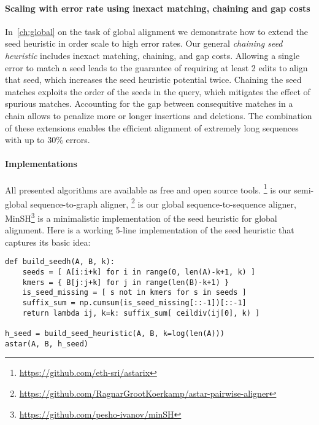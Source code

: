 \paragraph{Scaling with error rate using inexact matching, chaining and gap costs}
In~\cref{ch:global} on the task of global alignment we demonstrate how to extend
the seed heuristic in order scale to high error rates. Our general
\emph{chaining seed heuristic} includes inexact matching, chaining, and gap
costs. Allowing a single error to match a seed leads to the guarantee of
requiring at least 2 edits to align that seed, which increases the seed
heuristic potential twice. Chaining the seed matches exploits the order of the
seeds in the query, which mitigates the effect of spurious matches. Accounting
for the gap between consequitive matches in a chain allows to penalize more or
longer insertions and deletions. The combination of these extensions enables the
efficient alignment of extremely long sequences with up to 30\% errors. 

\paragraph{Implementations}
All presented algorithms are available as free and open source tools.
\astarix\footnote{\url{https://github.com/eth-sri/astarix}} is our semi-global
sequence-to-graph aligner,
\astarpa\footnote{\url{https://github.com/RagnarGrootKoerkamp/astar-pairwise-aligner}}
is our global sequence-to-sequence aligner,
MinSH\footnote{\url{https://github.com/pesho-ivanov/minSH}} is a minimalistic
implementation of the seed heuristic for global alignment. Here is a working
5-line implementation of the seed heuristic that captures its basic idea:

\begin{verbatim}
def build_seedh(A, B, k):
    seeds = [ A[i:i+k] for i in range(0, len(A)-k+1, k) ]
    kmers = { B[j:j+k] for j in range(len(B)-k+1) }
    is_seed_missing = [ s not in kmers for s in seeds ]
    suffix_sum = np.cumsum(is_seed_missing[::-1])[::-1]
    return lambda ij, k=k: suffix_sum[ ceildiv(ij[0], k) ]

h_seed = build_seed_heuristic(A, B, k=log(len(A)))
astar(A, B, h_seed)
\end{verbatim}